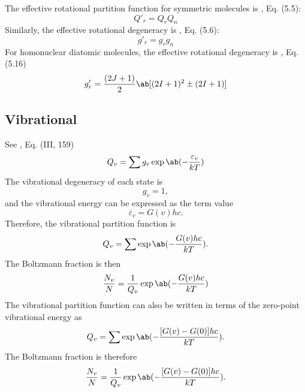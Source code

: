 \documentclass[11pt, twoside, fleqn]{report}
\begin{document}
The effective rotational partition function for symmetric molecules is \cite{hansonSpectroscopyOpticalDiagnostics2016}, Eq. (5.5):
\begin{equation*}
    Q'_r = Q_rQ_n
\end{equation*}
Similarly, the effective rotational degeneracy is \cite{hansonSpectroscopyOpticalDiagnostics2016}, Eq. (5.6):
\begin{equation*}
    g'_r = g_rg_n
\end{equation*}
For homonuclear diatomic molecules, the effective rotational degeneracy is \cite{hansonSpectroscopyOpticalDiagnostics2016}, Eq. (5.16)
\begin{equation*}
    g'_r = \frac{(2J + 1)}{2}\ab[(2I + 1)^2 \pm (2I + 1)]
\end{equation*}

\subsection{Vibrational}

See \cite{herzbergMolecularSpectraMolecular1950}, Eq. (III, 159)
\begin{equation*}
    Q_v = \sum g_v\exp\ab(-\frac{\varepsilon_v}{kT})
\end{equation*}
The vibrational degeneracy of each state is
\begin{equation*}
    g_v = 1,
\end{equation*}
and the vibrational energy can be expressed as the term value
\begin{equation*}
    \varepsilon_v = G(v)hc.
\end{equation*}
Therefore, the vibrational partition function is
\begin{equation*}
    Q_v = \sum \exp\ab(-\frac{G(v)hc}{kT}).
\end{equation*}
The Boltzmann fraction is then
\begin{equation*}
    \frac{N_v}{N} = \frac{1}{Q_v}\exp\ab(-\frac{G(v)hc}{kT})
\end{equation*}
The vibrational partition function can also be written in terms of the zero-point vibrational energy as
\begin{equation*}
    Q_v = \sum \exp\ab(-\frac{[G(v) - G(0)]hc}{kT}).
\end{equation*}
The Boltzmann fraction is therefore
\begin{equation*}
    \frac{N_v}{N} = \frac{1}{Q_v}\exp\ab(-\frac{[G(v) - G(0)]hc}{kT}).
\end{equation*}
\end{document}
